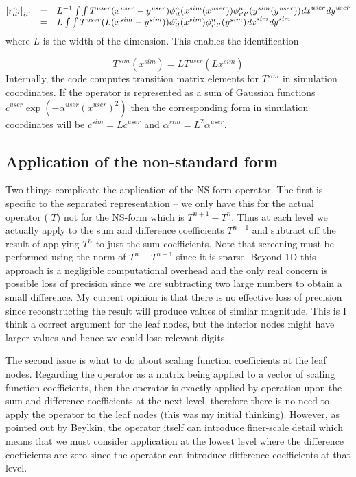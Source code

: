 \documentclass[letterpaper]{article}
\begin{document}
\begin{equation}
\begin{matrix}\left[r_{ll'}^{n}\right]_{ii'}&=&L^{-1}\int {\int
{T^{\mathit{user}}(x^{\mathit{user}}-y^{\mathit{user}})\phi _{il}^{n}(x^{sim}(x^{\mathit{user}}))\phi
_{i'l'}^{n}(y^{sim}(y^{\mathit{user}}))\mathit{dx}^{\mathit{user}}}\mathit{dy}^{\mathit{user}}}\\&=&L\int {\int
{T^{\mathit{user}}(L(x^{sim}-y^{sim}))\phi _{il}^{n}(x^{sim})\phi
_{i'l'}^{n}(y^{sim})\mathit{dx}^{\mathit{sim}}}\mathit{dy}^{\mathit{sim}}}\hfill\null \end{matrix}
\end{equation}
where  $L$ is the width of the dimension. This enables the identification 

\begin{equation}
T^{sim}(x^{sim})=LT^{\mathit{user}}(Lx^{sim})
\end{equation}
Internally, the code computes transition matrix elements for  $T^{sim}$ in simulation coordinates. If the operator is
represented as a sum of Gaussian functions  $c^{\mathit{user}}\exp (-\alpha ^{\mathit{user}}(x^{\mathit{user}})^{2})$
then the corresponding form in simulation coordinates will be  $c^{sim}=Lc^{\mathit{user}}$ and  $\alpha
^{\mathit{sim}}=L^{2}\alpha ^{\mathit{user}}$.

\subsection{Application of the non-standard form}
Two things complicate the application of the NS-form operator. The first is specific to the separated representation --
we only have this for the actual operator ( $T$) not for the NS-form which is  $T^{n+1}-T^{n}$. Thus at each level we
actually apply to the sum and difference coefficients  $T^{n+1}$ and subtract off the result of applying  $T^{n}$ to
just the sum coefficients. Note that screening must be performed using the norm of  $T^{n}-T^{n-1}$ since it is sparse.
Beyond 1D this approach is a negligible computational overhead and the only real concern is possible loss of precision
since we are subtracting two large numbers to obtain a small difference. My current opinion is that there is no
effective loss of precision since reconstructing the result will produce values of similar magnitude. This is I think a
correct argument for the leaf nodes, but the interior nodes might have larger values and hence we could lose relevant
digits.

The second issue is what to do about scaling function coefficients at the leaf nodes. Regarding the operator as a matrix
being applied to a vector of scaling function coefficients, then the operator is exactly applied by operation upon the
sum and difference coefficients at the next level, therefore there is no need to apply the operator to the leaf nodes
(this was my initial thinking). However, as pointed out by Beylkin, the operator itself can introduce finer-scale
detail which means that we must consider application at the lowest level where the difference coefficients are zero
since the operator can introduce difference coefficients at that level.
\end{document}
